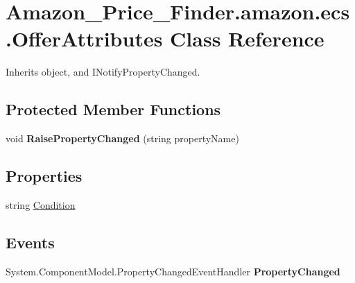 \hypertarget{class_amazon___price___finder_1_1amazon_1_1ecs_1_1_offer_attributes}{\section{Amazon\-\_\-\-Price\-\_\-\-Finder.\-amazon.\-ecs.\-Offer\-Attributes Class Reference}
\label{class_amazon___price___finder_1_1amazon_1_1ecs_1_1_offer_attributes}
}


 




Inherits object, and I\-Notify\-Property\-Changed.

\subsection*{Protected Member Functions}
\begin{DoxyCompactItemize}
\item 
\hypertarget{class_amazon___price___finder_1_1amazon_1_1ecs_1_1_offer_attributes_a241cbed87aeaf10ca67d88717d05cf3b}{void {\bfseries Raise\-Property\-Changed} (string property\-Name)}\label{class_amazon___price___finder_1_1amazon_1_1ecs_1_1_offer_attributes_a241cbed87aeaf10ca67d88717d05cf3b}

\end{DoxyCompactItemize}
\subsection*{Properties}
\begin{DoxyCompactItemize}
\item 
\hypertarget{class_amazon___price___finder_1_1amazon_1_1ecs_1_1_offer_attributes_a36483b19a0b353c69305cec1738fc29a}{string \hyperlink{class_amazon___price___finder_1_1amazon_1_1ecs_1_1_offer_attributes_a36483b19a0b353c69305cec1738fc29a}{Condition}}\label{class_amazon___price___finder_1_1amazon_1_1ecs_1_1_offer_attributes_a36483b19a0b353c69305cec1738fc29a}

\begin{DoxyCompactList}\small\item\em \end{DoxyCompactList}\end{DoxyCompactItemize}
\subsection*{Events}
\begin{DoxyCompactItemize}
\item 
\hypertarget{class_amazon___price___finder_1_1amazon_1_1ecs_1_1_offer_attributes_ab590ea80eb5d7e706c34a8946aef5b93}{System.\-Component\-Model.\-Property\-Changed\-Event\-Handler {\bfseries Property\-Changed}}\label{class_amazon___price___finder_1_1amazon_1_1ecs_1_1_offer_attributes_ab590ea80eb5d7e706c34a8946aef5b93}

\end{DoxyCompactItemize}


